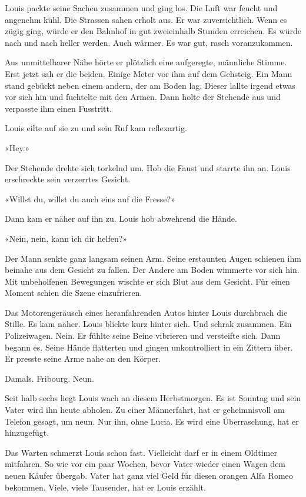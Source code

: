 Louis packte seine Sachen zusammen und ging los. Die Luft war feucht und
angenehm kühl. Die Strassen sahen erholt aus. Er war zuversichtlich.
Wenn es zügig ging, würde er den Bahnhof in gut zweieinhalb Stunden
erreichen. Es würde nach und nach heller werden. Auch wärmer. Es war
gut, rasch voranzukommen.

Aus unmittelbarer Nähe hörte er plötzlich eine aufgeregte, männliche
Stimme. Erst jetzt sah er die beiden. Einige Meter vor ihm auf dem
Gehsteig. Ein Mann stand gebückt neben einem andern, der am Boden lag.
Dieser lallte irgend etwas vor sich hin und fuchtelte mit den Armen.
Dann holte der Stehende aus und verpasste ihm einen Fusstritt.

Louis eilte auf sie zu und sein Ruf kam reflexartig.

«Hey.»

Der Stehende drehte sich torkelnd um. Hob die Faust und starrte ihn an.
Louis erschreckte sein verzerrtes Gesicht.

«Willst du, willst du auch eins auf die Fresse?»

Dann kam er näher auf ihn zu. Louis hob abwehrend die Hände.

«Nein, nein, kann ich dir helfen?»

Der Mann senkte ganz langsam seinen Arm. Seine erstaunten Augen schienen
ihm beinahe aus dem Gesicht zu fallen. Der Andere am Boden wimmerte vor
sich hin. Mit unbeholfenen Bewegungen wischte er sich Blut aus dem
Gesicht. Für einen Moment schien die Szene einzufrieren.

Das Motorengeräusch eines heranfahrenden Autos hinter Louis durchbrach
die Stille. Es kam näher. Louis blickte kurz hinter sich. Und schrak
zusammen. Ein Polizeiwagen. Nein. Er fühlte seine Beine vibrieren und
versteifte sich. Dann begann es. Seine Hände flatterten und gingen
unkontrolliert in ein Zittern über. Er presste seine Arme nahe an den
Körper.

Damals. Fribourg. Neun.

Seit halb sechs liegt Louis wach an diesem Herbstmorgen. Es ist Sonntag
und sein Vater wird ihn heute abholen. Zu einer Männerfahrt, hat er
geheimnisvoll am Telefon gesagt, um neun. Nur ihn, ohne Lucia. Es wird
eine Überraschung, hat er hinzugefügt.

Das Warten schmerzt Louis schon fast. Vielleicht darf er in einem
Oldtimer mitfahren. So wie vor ein paar Wochen, bevor Vater wieder einen
Wagen dem neuen Käufer übergab. Vater hat ganz viel Geld für diesen
orangen Alfa Romeo bekommen. Viele, viele Tausender, hat er Louis
erzählt.

